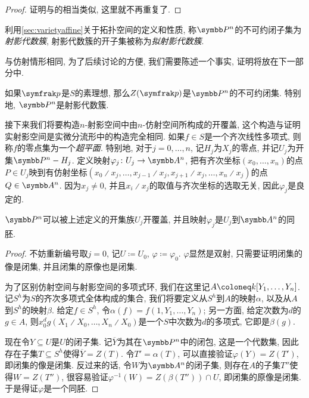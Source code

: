 \begin{proof}
  证明与的相当类似, 这里就不再重复了.
\end{proof}

\begin{definition}
  利用\ref{sec:varietyaffine}关于拓扑空间的定义和性质, 称$\PP^n$的不可约闭子集为\emph{射影代数簇}, 射影代数簇的开子集被称为\emph{拟射影代数簇}.
\end{definition}

与仿射情形相同, 为了后续讨论的方便, 我们需要陈述一个事实, 证明将放在下一部分中.

\begin{proposition}\label{prop:projectiveprimeirreducible}
  如果$\ideal{p}$是$S$的素理想, 那么$Z(\ideal{p})$是$\PP^n$的不可约闭集. 特别地, $\PP^n$是射影代数簇.
\end{proposition}

接下来我们将要构造$n$-射影空间中由$n$-仿射空间所构成的开覆盖, 这个构造与证明实射影空间是实微分流形中的构造\parencite[4--5, Definition 2.4]{flaherty_riemannian_1992}完全相同. 如果$f\in S$是一个齐次线性多项式, 则称$f$的零点集为一个\emph{超平面}. 特别地, 对于$j=0, \dotsc, n$, 记$H_j$为$X_j$的零点, 并记$U_j$为开集$\PP^n-H_j$. 定义映射$\varphi_j\colon U_j\to \AF^n$, 把有齐次坐标$(x_0, \dotsc, x_n)$的点$P\in U_j$映到有仿射坐标$(x_0{\divslash}x_j, \dotsc, x_{j-1}{\divslash}x_j, x_{j+1}{\divslash}x_j, \dotsc,  x_n{\divslash}x_j)$的点$Q\in \AF^n$. 因为$x_j\neq 0$, 并且$x_i{\divslash}x_j$的取值与齐次坐标的选取无关, 因此$\varphi_j$是良定的.

\begin{proposition}\label{prop:projspaceopencoverhomeo}
  $\PP^n$可以被上述定义的开集族$U_j$开覆盖, 并且映射$\varphi_j$是$U_j$到$\AF^n$的同胚.
\end{proposition}

\begin{proof}
  不妨重新编号取$j=0$, 记$U\coloneq U_0$, $\varphi\coloneq \varphi_0$. $\varphi$显然是双射, 只需要证明闭集的像是闭集, 并且闭集的原像也是闭集.

  为了区别仿射空间与射影空间的多项式环, 我们在这里记$A\coloneq \kk [Y_1, \dotsc, Y_n]$. 记$S^h$为$S$的齐次多项式全体构成的集合, 我们将要定义从$S^h$到$A$的映射$\alpha$, 以及从$A$到$S^h$的映射$\beta$. 给定$f\in S^h$, 令$\alpha(f)=f(1, Y_1, \dotsc, Y_n)$; 另一方面, 给定次数为$d$的$g\in A$, 则$x_0^dg(X_1{\divslash}X_0, \dotsc, X_n{\divslash}X_0)$是一个$S$中次数为$d$的多项式, 它即是$\beta(g)$.

  现在令$Y\subseteq U$是$U$的闭子集. 记$\overline{Y}$为其在$\PP^n$中的闭包, 这是一个代数集, 因此存在子集$T\subseteq S^h$使得$\overline{Y}=Z(T)$. 令$T'=\alpha(T)$, 可以直接验证$\varphi(Y)=Z(T')$, 即闭集的像是闭集. 反过来的话, 令$W$为$\AF^n$的闭子集, 则存在$A$的子集$T''$使得$W=Z(T'')$, 很容易验证$\varphi^{-1}(W) = Z(\beta(T''))\cap U$, 即闭集的原像是闭集. 于是得证$\varphi$是一个同胚.
\end{proof}

